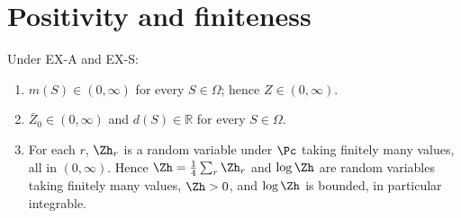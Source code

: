 \documentclass[11pt]{report}
\begin{document}
\section{Positivity and finiteness}

\begin{T31lemma}\label{T31:lem:pos}
Under EX-A and EX-S:
\begin{enumerate}[label=(\roman*)]
\item $m(S)\in(0,\infty)$ for every $S\in\Omega$; hence $Z\in(0,\infty)$.
\item $\bar Z_0\in(0,\infty)$ and $d(S)\in\mathbb{R}$ for every $S\in\Omega$.
\item For each $r$, $\Zh_r$ is a random variable under $\Pc$ taking finitely many values, all in $(0,\infty)$. Hence
$\Zh=\frac14\sum_r\Zh_r$ and $\log\Zh$ are random variables taking finitely many values, $\Zh>0$, and $\log\Zh$ is
bounded, in particular integrable.
\end{enumerate}
\end{T31lemma}
\end{document}

